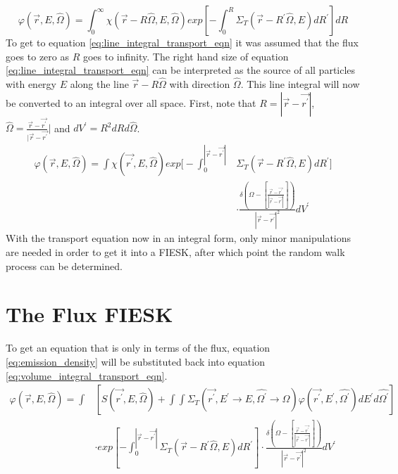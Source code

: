 \vspace{0.5cm}
\begin{equation}
    \varphi(\vec{r},E,\hat{\Omega}) = 
    \int_0^{\infty} \chi(\vec{r} - R\hat{\Omega},E,\hat{\Omega})
    exp\left[-\int_0^R \Sigma_T(\vec{r}-R^{'}\hat{\Omega},E)dR^{'} \right] dR
  \label{eq:line_integral_transport_eqn}
\end{equation}
To get to equation \ref{eq:line_integral_transport_eqn} it was assumed that the
flux goes to zero as $R$ goes to infinity. The right hand size of equation 
\ref{eq:line_integral_transport_eqn} can be interpreted as the source of all
particles with energy $E$ along the line $\vec{r}-R\hat{\Omega}$ with direction
$\hat{\Omega}$. This line integral will now be converted to an integral over 
all space. First, note that $R = |\vec{r} - \vec{r^{'}}|$,
$\hat{\Omega} = \frac{\vec{r} - \vec{r^{'}}}{|\vec{r} - \vec{r^{'}}}|$ and
$dV^{'} = R^2dRd\hat{\Omega}$.
\begin{equation}
  \begin{split}
    \varphi(\vec{r},E,\hat{\Omega}) = 
    \int \chi(\vec{r^{'}},E,\hat{\Omega})
    exp\Big[-\int_0^{|\vec{r} - \vec{r^{'}}|} 
      &\Sigma_T(\vec{r}-R^{'}\hat{\Omega},E)dR^{'} \Big] \\
    &\cdot \frac{\delta \left(\Omega - \left[\frac{\vec{r} - \vec{r^{'}}}
        {|\vec{r} - \vec{r^{'}}|}\right]\right)}
    {|\vec{r} - \vec{r^{'}}|^2} dV^{'}
  \end{split}
  \label{eq:volume_integral_transport_eqn}
\end{equation}
With the transport equation now in an integral form, only minor manipulations
are needed in order to get it into a FIESK, after which point the random walk 
process can be determined.

\section{The Flux FIESK}
To get an equation that is only in terms of the flux, equation 
\ref{eq:emission_density} will be substituted back into equation 
\ref{eq:volume_integral_transport_eqn}.
\begin{equation*}
  \begin{split}
    \varphi(\vec{r},E,\hat{\Omega}) = \int &\left[
    S(\vec{r^{'}},E,\hat{\Omega}) + 
    \int\int \Sigma_T(\vec{r^{'}},E^{'} \to E, \hat{\Omega^{'}} \to \hat{\Omega})
    \varphi(\vec{r^{'}},E^{'},\hat{\Omega^{'}})dE^{'}d\hat{\Omega^{'}} \right] \\
    & \cdot exp\left[-\int_0^{|\vec{r} - \vec{r^{'}}|} 
      \Sigma_T(\vec{r}-R^{'}\hat{\Omega},E)dR^{'} \right]
    \cdot \frac{\delta \left(\Omega - \left[\frac{\vec{r} - \vec{r^{'}}}
        {|\vec{r} - \vec{r^{'}}|}\right]\right)} 
    {|\vec{r} - \vec{r^{'}}|^2} dV^{'}
  \end{split}
\end{equation*}

